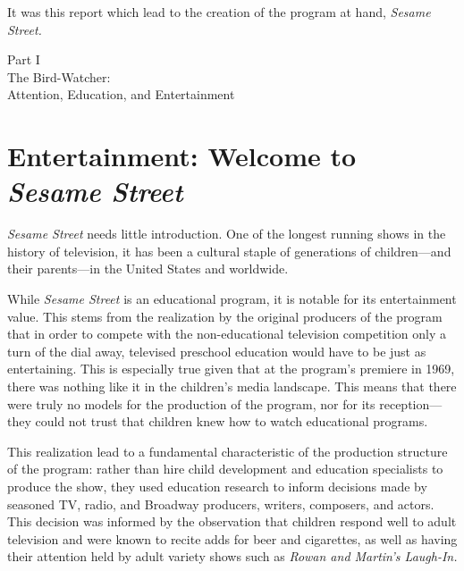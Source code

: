 \documentclass[12pt,letterpaper]{article}
\begin{document}
	It was this report which lead to the creation of the program at hand, 
	\textit{Sesame Street.}


	\newpage
	\thispagestyle{empty}
	\vspace*{30pt}
	\begin{center}
	{\Huge Part I\\ 
	\Large The Bird-Watcher:\\
	Attention, Education, and Entertainment}
	\end{center}
	\newpage

	\section*{Entertainment: Welcome to \textit{Sesame Street}}

	\noindent\textit{Sesame Street} needs little introduction. One of the
	longest
	running shows in the history of television,\autocite{Brit} it has been a 
	cultural staple of generations of children---and their parents---in the 
	United States and worldwide.

	While \textit{Sesame Street} is an educational program, it is notable 
	for its entertainment value. This stems from the realization by the 
	original producers of the program that in order to compete with the 
	non-educational television competition only a turn of the dial away,
	televised preschool education would have to be just as 
	entertaining.\autocite[38]{Cooney} This is especially true given that
	at the program's premiere in 1969, there was nothing like it in the 
	children's media landscape.\autocite[See chapter 3 for a survey of the 
	contemporary children's television landscape]{Davis} This means that 
	there were truly no models for the production of the program, nor for 
	its
	reception---they could not trust that children knew how to watch
	educational programs.  

	This realization lead to a fundamental characteristic of the production
	structure of the program: rather than hire child development and 
	education specialists to produce the show, they used education research
	to inform decisions made by seasoned TV, radio, and Broadway producers,
	writers, composers, and actors. This decision was informed by the 
	observation
	that children respond well to adult television and were known to recite
	adds for beer and cigarettes, as well as having their attention held by
	adult variety shows such as \textit{Rowan and Martin's Laugh-In.}
	\autocite[16]{Ostrofsky2012}
\end{document}
